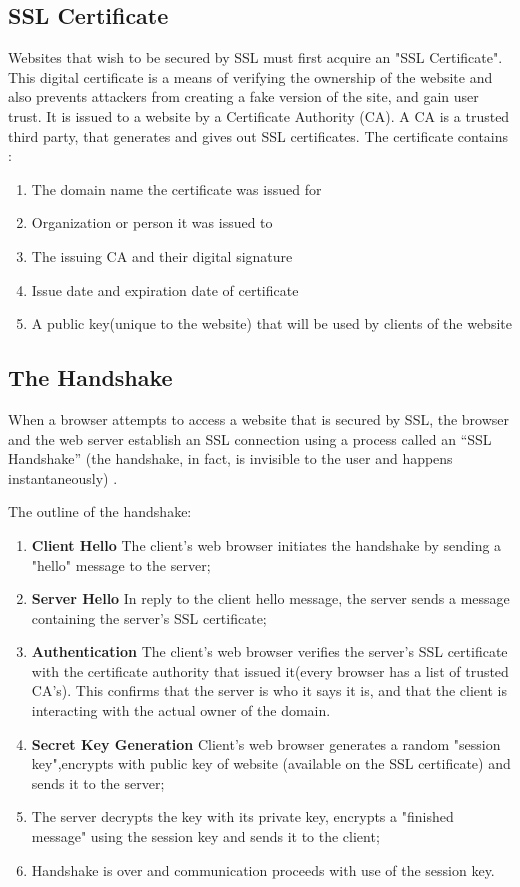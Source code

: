 \subsection{SSL Certificate} 
Websites that wish to be secured by SSL must first acquire an "SSL Certificate". 
This digital certificate is a means of verifying the ownership of the website and also prevents attackers from creating a fake version of the site, and gain user trust. 
It is issued to a website by a Certificate Authority (CA). 
A CA is a trusted third party, that generates and gives out SSL certificates. The certificate contains \cite{cloudflare_certificate}:
\begin{enumerate}
    \item The domain name the certificate was issued for
    \item Organization or person it was issued to
    \item The issuing CA and their digital signature
    \item Issue date and expiration date of certificate
    \item A public key(unique to the website) that will be used by clients of the website
\end{enumerate}

\subsection{The Handshake} 

When a browser attempts to access a website that is secured by SSL, the browser and the web server establish an SSL connection using a process called an “SSL Handshake” (the handshake, in fact, is invisible to the user and happens instantaneously) \cite{digicert, cloudflare_handshake}.

The outline of the handshake:

\begin{enumerate}
\item \textbf{Client Hello} The client's web browser initiates the handshake by sending a "hello" message to the server;
\item \textbf{Server Hello} In reply to the client hello message, the server sends a message containing the server's SSL certificate;
\item \textbf{Authentication} The client's web browser verifies the server's SSL certificate with the certificate authority that issued it(every browser has a list of trusted CA's). This confirms that the server is who it says it is, and that the client is interacting with the actual owner of the domain.
\item \textbf{Secret Key Generation} Client's web browser generates a random "session key",encrypts with public key of website (available on the SSL certificate) and sends it to the server;
\item The server decrypts the key with its private key, encrypts a "finished message" using the session key and sends it to the client;
\item Handshake is over and communication proceeds with use of the session key.
\end{enumerate}
